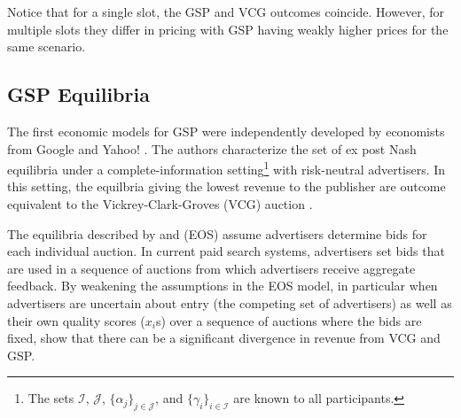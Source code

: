 \documentclass[prodmode,acmtist]{acmsmall} %
\begin{document}

Notice that for a single slot, the GSP and VCG outcomes coincide.
However, for multiple slots they differ in pricing with GSP having weakly higher prices for the same scenario.
 

\subsection{GSP Equilibria} %
\label{sub:equilibrium_characterization}

The first economic models for GSP were independently developed by economists from Google \cite{Varian:2007kx}
and Yahoo! \cite{Edelman:2007vn}.
The authors characterize the set of ex post Nash equilibria under a complete-information setting\footnote{The sets $\mathcal{I}$, $\mathcal{J}$, $\{\alpha_j\}_{j\in \mathcal{J}}$, and $\{\gamma_i\}_{i \in \mathcal{I}}$ are known to all participants.} with risk-neutral advertisers.
In this setting, the equilbria giving the lowest revenue to the publisher are outcome equivalent to the Vickrey-Clark-Groves (VCG) auction \cite{Vickrey:1961ys}.

The equilibria described by  and  (EOS) assume advertisers determine bids for each individual auction. 
In current paid search systems, advertisers set bids that are used in a sequence of auctions from which advertisers receive aggregate feedback. 
By weakening the assumptions in the EOS model, in particular when advertisers are uncertain about entry (the competing set of advertisers) as well as their own quality scores ($x_i$s) over a sequence of auctions where the bids are fixed,  show that there can be a significant divergence in revenue from VCG and GSP.
\end{document}
